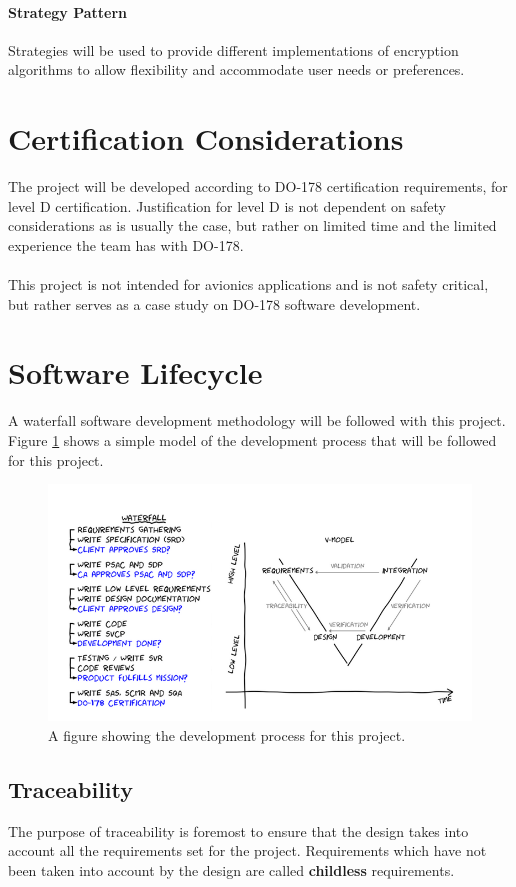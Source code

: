 \documentclass[11pt]{article}
\begin{document}
\paragraph{Strategy Pattern}
Strategies will be used to provide different implementations of encryption algorithms to allow flexibility and accommodate user needs or preferences.

\section{Certification Considerations}
The project will be developed according to DO-178 certification requirements, for level D certification. Justification for level D is not dependent on safety considerations as is usually the case, but rather on limited time and the limited experience the team has with DO-178. \\ \\
This project is not intended for avionics applications and is not safety critical, but rather serves as a case study on DO-178 software development.

\section{Software Lifecycle}\label{sec:soft-life}
A waterfall software development methodology will be followed with this project. Figure \ref{figure-waterfall} shows a simple model of the development process that will be followed for this project.

\begin{figure}[H]
\centering
\includegraphics[width=4.5in]{./images/waterfall_model.png}
\caption[Waterfall Model]{A figure showing the development process for this project.}
\label{figure-waterfall}
\end{figure}

\subsection{Traceability}
The purpose of traceability is foremost to ensure that the design takes into account all the requirements set for the project. Requirements which have not been taken into account by the design are called \textbf{childless} requirements.\\
\end{document}
